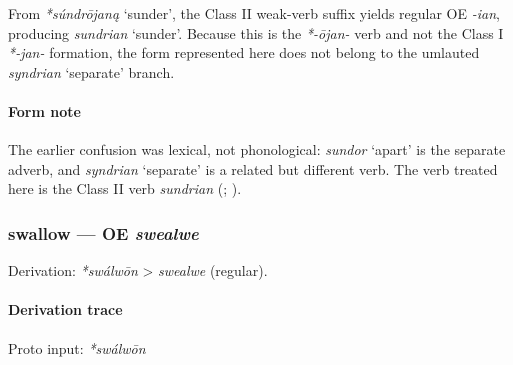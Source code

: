 \documentclass[
  british,
  a4paper,
]{article}
\providecommand{\Recon}[1]{\emph{*#1}}
\begin{document}
From \Recon{súndrōjaną} `sunder', the Class II weak-verb suffix yields
regular OE \emph{-ian}, producing \emph{sundrian} `sunder'. Because this
is the \emph{*-ōjan-} verb and not the Class I \emph{*-jan-} formation,
the form represented here does not belong to the umlauted
{\emph{syndrian}} `separate' branch.

\paragraph{Form note}\label{form-note-22}

The earlier confusion was lexical, not phonological: {\emph{sundor}}
`apart' is the separate adverb, and {\emph{syndrian}} `separate' is a
related but different verb. The verb treated here is the Class II verb
\emph{sundrian} (;
).

\subsubsection{\texorpdfstring{swallow --- OE
\emph{swealwe}}{swallow --- OE swealwe}}\label{swallow-oe-swealwe}

Derivation: \emph{*swálwōn} \textgreater{} \emph{swealwe} (regular).

\paragraph{Derivation trace}\label{derivation-trace-61}

Proto input: \emph{*swálwōn}

\begingroup
\setlength{\fboxsep}{6pt}
\end{document}
